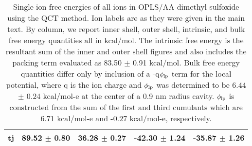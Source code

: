 \begin{table}
\begin{center}
\begin{tabular}{ccccc}
tj	&	89.52	$\pm$	0.80	&	36.28	$\pm$	0.27	&	-42.30	$\pm$	1.24	&	-35.87	$\pm$	1.26	\\
  \hline
  \hline
 \end{tabular}
 \end{center}
 \caption[Quasichemical partitioning of solvation free energies in dimethyl sulfoxide]{\label{tab:dmso}Single-ion free energies of all ions in OPLS/AA dimethyl
 sulfoxide using the QCT method. Ion labels are as they were given in the main text.
 By column, we report inner shell, outer shell, intrinsic, and bulk free energy quantities all in kcal/mol. The intrinsic free energy is the resultant sum of the inner
 and outer shell figures and also includes the packing term evaluated as 83.50 $\pm$ 0.91 kcal/mol. Bulk free energy quantities differ only by inclusion of a 
 -q$\phi_{\mathrm{lp}}$ term  for the local potential, where q is the ion charge and $\phi_{\mathrm{lp}}$ was determined to be 6.44 $\pm$ 0.24 kcal/mol-e at the center of 
 a 0.9 nm radius cavity. $\phi_{\mathrm{lp}}$ is constructed from the sum of the first and third cumulants which are 6.71 kcal/mol-e and -0.27 kcal/mol-e, respectively.}
\end{table}

